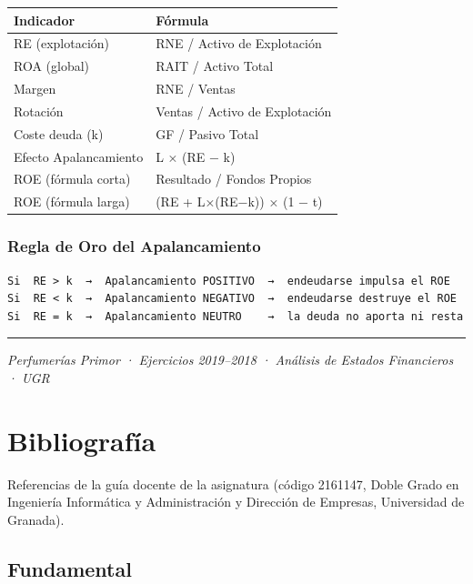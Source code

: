 \documentclass[12pt]{book} %
\begin{document}
\begin{longtable}[]{@{}ll@{}}
\toprule\noalign{}
Indicador & Fórmula \\
\midrule\noalign{}
\endhead
\bottomrule\noalign{}
\endlastfoot
RE (explotación) & RNE / Activo de Explotación \\
ROA (global) & RAIT / Activo Total \\
Margen & RNE / Ventas \\
Rotación & Ventas / Activo de Explotación \\
Coste deuda (k) & GF / Pasivo Total \\
Efecto Apalancamiento & L × (RE − k) \\
ROE (fórmula corta) & Resultado / Fondos Propios \\
ROE (fórmula larga) & (RE + L×(RE−k)) × (1 − t) \\
\end{longtable}

\hypertarget{regla-de-oro-del-apalancamiento}{%
\subsection{Regla de Oro del
Apalancamiento}\label{regla-de-oro-del-apalancamiento}}

\begin{verbatim}
Si  RE > k  →  Apalancamiento POSITIVO  →  endeudarse impulsa el ROE
Si  RE < k  →  Apalancamiento NEGATIVO  →  endeudarse destruye el ROE
Si  RE = k  →  Apalancamiento NEUTRO    →  la deuda no aporta ni resta
\end{verbatim}

\begin{center}\rule{0.5\linewidth}{0.5pt}\end{center}

\emph{Perfumerías Primor · Ejercicios 2019--2018 · Análisis de Estados
Financieros · UGR}

\hypertarget{bibliografuxeda}{%
\chapter{Bibliografía}\label{bibliografuxeda}}

Referencias de la guía docente de la asignatura (código 2161147, Doble
Grado en Ingeniería Informática y Administración y Dirección de
Empresas, Universidad de Granada).

\hypertarget{fundamental}{%
\section{Fundamental}\label{fundamental}}
\end{document}
